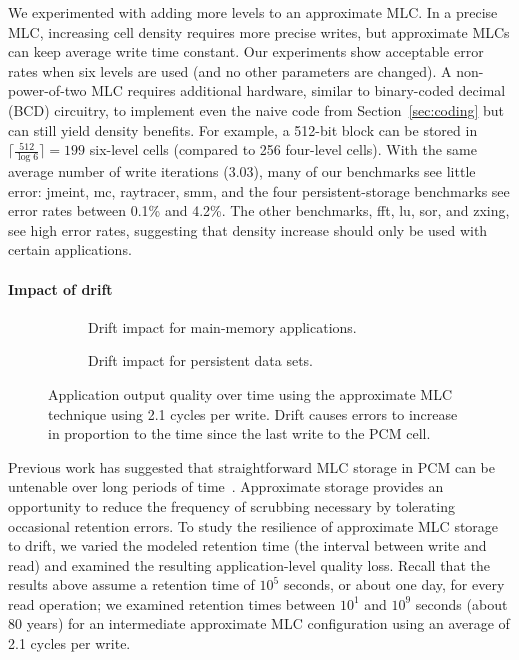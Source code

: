 \documentclass[prodmode,acmtocs]{acmsmall}
\begin{document}
We experimented with adding more levels to an approximate MLC.
In a precise MLC, increasing
cell density requires more precise writes, but
approximate MLCs
can keep average write time
constant.
Our experiments show acceptable error rates when six levels are used (and no
other parameters are changed).
A non-power-of-two MLC requires additional hardware,
similar to binary-coded decimal (BCD) circuitry, to implement even the naive
code from Section~\ref{sec:coding} but can
still yield density benefits. For example, a 512-bit block can be stored in
$\lceil \frac{512}{\log 6} \rceil = 199$
six-level cells (compared to 256 four-level cells). With the same average number of
write iterations (3.03), many of our benchmarks
see little error: \textsf{jmeint}, \textsf{mc}, \textsf{raytracer},
\textsf{smm}, and the four persistent-storage benchmarks see error rates between
0.1\% and 4.2\%.
The other benchmarks, \textsf{fft}, \textsf{lu},
\textsf{sor}, and \textsf{zxing}, see high error rates, suggesting that
density increase should only be used with certain applications.

\paragraph{Impact of drift}

\begin{figure}
    \begin{subfigure}[b]{0.5\columnwidth}
        \centering
        
        \caption{
            Drift impact for main-memory applications.
        }
        \label{fig:mm-drift}
    \end{subfigure}
    \begin{subfigure}[b]{0.5\columnwidth}
        \centering
        
        \caption{
            Drift impact for persistent data sets.
        }
        \label{fig:nv-drift}
    \end{subfigure}
    \caption{
        Application output quality over time using the approximate MLC
        technique using 2.1 cycles per write.
        Drift causes errors to increase in proportion to the time
        since the last write to the PCM cell.
    }
    \label{fig:drift}
\end{figure}

Previous work has suggested that straightforward MLC storage in PCM can be
untenable over long periods of time~\cite{wdddmlcpcm}.
Approximate storage provides an opportunity to reduce the frequency of
scrubbing necessary by tolerating occasional retention errors.
To study the resilience of approximate MLC storage to drift,
we varied the modeled retention time (the interval between write and read) and
examined the resulting application-level quality loss.
Recall that the results
above assume a retention time of $10^5$ seconds, or about one day, for every
read operation; we examined retention times between $10^1$ and $10^9$ seconds
(about 80 years) for an intermediate approximate MLC configuration using an
average of 2.1 cycles per write.
\end{document}
